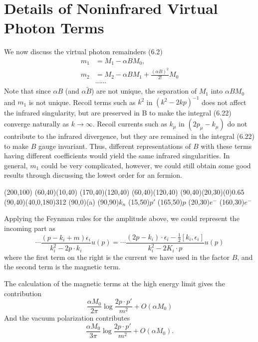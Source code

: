 \section{Details of Noninfrared Virtual Photon Terms}
We now discuss the virtual photon remainders (6.2)
\begin{align}
m_1 &= M_1 - \alpha B M_0,\nonumber\\
m_2 &= M_2 - \alpha B M_1 + \frac{(\alpha B)^2}{2!} M_0\nonumber\\
&\cdots\cdots
\end{align}
Note that since $\alpha B$ (and $\alpha\tilde{B}$) are not unique, the separation of $M_1$ into $\alpha B M_0$ and $m_1$ is not unique. Recoil terms such as $k^2$ in $(k^2 - 2kp)^{-1}$ does not affect the infrared singularity, but are preserved in B to make the integral (6.22) converge naturally as $k \to \infty$. Recoil currents such as $k_\mu$ in $(2p_\mu - k_\mu)$ do not contribute to the infrared divergence, but they are remained in the integral (6.22) to make $B$ gauge invariant. Thus, different representations of $B$ with these terms having different coefficients would yield the same infrared singularities. In general, $m_1$ could be very complicated, however, we could still obtain some good results through discussing the lowest order for an fermion. 
	\begin{center}
	\begin{axopicture}(200,100)
		\Line[arrow](60,40)(10,40)
		\Line[arrow](170,40)(120,40)
		\Line[arrow](60,40)(120,40)
		\GOval(90,40)(20,30)(0){0.65}
		\PhotonArc(90,40)(40,0,180){3}{12}
		\Text(90,0){(a)}
		\Text(90,90){$k_n$}
		\Text(15,50){$p'$} 	\Text(165,50){$p$}
		\Text(20,30){$e^-$} \Text(160,30){$e^-$}
	\end{axopicture}                   
\end{center}
Applying the Feynman rules for the amplitude above, we could represent the incoming part as 
\begin{equation}
\cdots \frac{(p-k_i+m)\epsilon_i}{k_i^2-2p\cdot k_i}u(p) = \cdots \frac{(2p-k_i)\cdot\epsilon_i - \frac{1}{2} [k_i,\epsilon_i]}{k_i^2-2K_i\cdot p}u(p)
\end{equation}
where the first term on the right is the current we have used in the factor $B$, and the second term is the magnetic term.

The calculation of the magnetic terms at the high energy limit gives the contribution
\begin{equation}
\frac{\alpha M_0}{2\pi}\log\frac{2p\cdot p'}{m^2} + O(\alpha M_0)
\end{equation}
And the vacuum polarization contributes
\begin{equation}
\frac{\alpha M_0}{3\pi}\log\frac{2p\cdot p'}{m^2} + O(\alpha M_0).
\end{equation}

